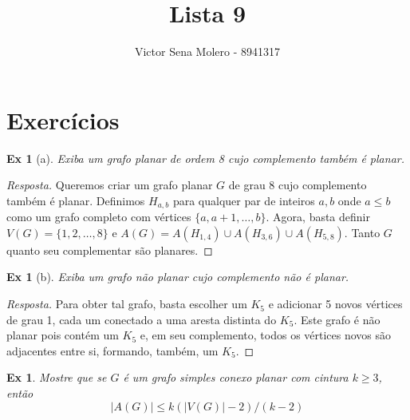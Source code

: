 \documentclass[12pt]{article}
\newcounter{exCounter}
\newtheorem{ex}[exCounter]{Ex}
\begin{document}
 
 
\title{Lista 9}
\author{Victor Sena Molero - 8941317}
\maketitle

\section{Exercícios}
\begin{ex}[a]
Exiba um grafo planar de ordem 8 cujo complemento também é planar.
\end{ex}
\setcounter{exCounter}{31}

\begin{proof}[Resposta]
Queremos criar um grafo planar $G$ de grau 8 cujo complemento também é planar. Definimos $H_{a,b}$ para qualquer par de inteiros $a,b$ onde $a \leq b$ como um grafo completo com vértices $\{a,a+1,\dots,b\}$. Agora, basta definir $V(G) = \{1,2,\dots,8\}$ e $A(G) = A(H_{1,4}) \cup A(H_{3,6}) \cup A(H_{5,8})$. Tanto $G$ quanto seu complementar são planares.
\end{proof}

\begin{ex}[b]
Exiba um grafo não planar cujo complemento não é planar.
\end{ex}

\begin{proof}[Resposta]
Para obter tal grafo, basta escolher um $K_5$ e adicionar 5 novos vértices de grau 1, cada um conectado a uma aresta distinta do $K_5$. Este grafo é não planar pois contém um $K_5$ e, em seu complemento, todos os vértices novos são adjacentes entre si, formando, também, um $K_5$.
\end{proof}

\begin{ex}
Mostre que se $G$ é um grafo simples conexo planar com cintura $k \geq 3$, então
$$ |A(G)| \leq k(|V(G)| - 2)/(k-2) $$
\end{ex}
\end{document}
